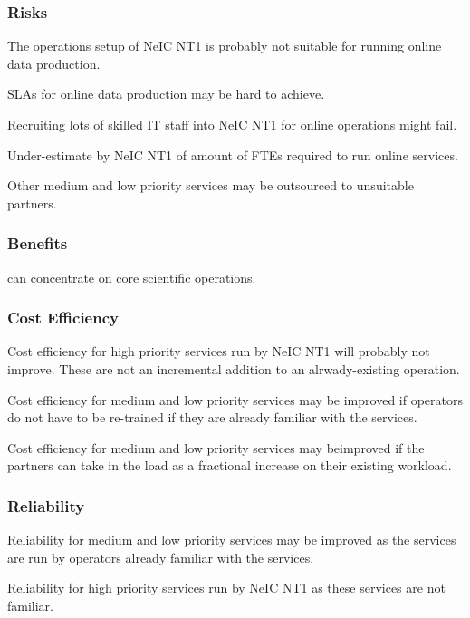 \documentclass[12pt,a4paper]{article}
\newcommand{\nnt}{NeIC NT1\xspace}
\begin{document}

\subsubsection*{Risks}
\bitm
  \item The operations setup of NeIC NT1 is probably not suitable for running online data production.
  \item SLAs for online data production may be hard to achieve.
  \item Recruiting lots of skilled IT staff into \nnt for online operations might fail.
  \item Under-estimate by \nnt of amount of FTEs required to run online services.
  \item Other medium and low priority services may be outsourced to unsuitable partners.
\eitm

\subsubsection*{Benefits}
\bitm
\item \EC can concentrate on core scientific operations.
\eitm

\subsubsection*{Cost Efficiency}
\bitm
\item Cost efficiency for high priority services run by \nnt will probably not improve.
  These are not an incremental addition to an alrwady-existing operation.
  \item Cost efficiency for medium and low priority services may be improved if operators do not have to be re-trained if they are already familiar with the services.
  \item Cost efficiency for medium and low priority services may beimproved if the partners can take in the \ED load as a fractional increase on their existing workload.
\eitm

\subsubsection*{Reliability}
\bitm
  \item Reliability for medium and low priority services may be improved as the services are run by operators already familiar with the services.
  \item Reliability for high priority services run by \nnt as these services are not familiar.
\eitm
\end{document}
